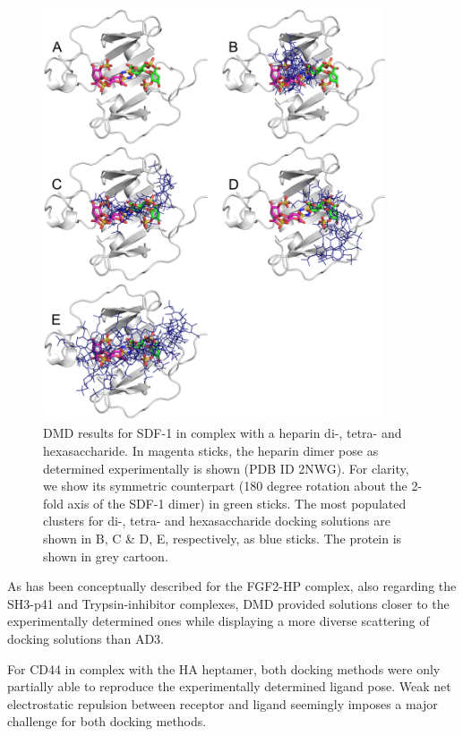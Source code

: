 \begin{figure}
\centering
\includegraphics[width=0.9\textwidth]{gfx/dmd/suppl/suppl_sdf1_dmd_he-2-4-6.png}
\caption[]{
DMD results for SDF-1 in complex with a heparin di-, tetra- and hexasaccharide.
In magenta sticks, the heparin dimer pose as determined experimentally is shown
(PDB ID 2NWG). For clarity, we show its symmetric counterpart (180 degree
rotation about the 2-fold axis of the SDF-1 dimer) in green sticks. The most
populated clusters for di-, tetra- and hexasaccharide docking solutions are
shown in B, C \& D, E, respectively, as blue sticks. The protein is shown in
grey cartoon.
}
\label{fig:dmd:sdf1_hp_246}
\end{figure}


As has been conceptually described for the FGF2-HP complex, also regarding the
SH3-p41 and Trypsin-inhibitor complexes, DMD provided solutions closer to the
experimentally determined ones while displaying a more diverse scattering of
docking solutions than AD3.

For CD44 in complex with the HA heptamer, both docking methods were only
partially able to reproduce the experimentally determined ligand pose. Weak net
electrostatic repulsion between receptor and ligand seemingly imposes a major
challenge for both docking methods.

